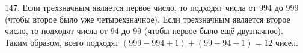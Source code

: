 147. Если трёхзначным является первое число, то подходят числа от 994 до 999 (чтобы второе было уже четырёхзначное). Если трёхзначным является второе число, то подходят числа от 94 до 99 (чтобы первое было ещё двузначное). Таким образом, всего подходят $(999-994+1)+(99-94+1)=12$ чисел.\\
